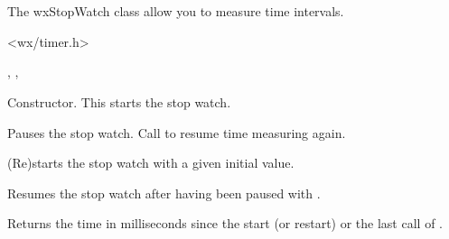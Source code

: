 \section{}\label{wxstopwatch}

The wxStopWatch class allow you to measure time intervals.


<wx/timer.h>


, , 




Constructor. This starts the stop watch.

\label{wxstopwatchpause}


Pauses the stop watch. Call  to resume 
time measuring again.



(Re)starts the stop watch with a given initial value.

\label{wxstopwatchresume}


Resumes the stop watch after having been paused with .


\label{wxstopwatchtime}

Returns the time in milliseconds since the start (or restart) or the last call of 
.


